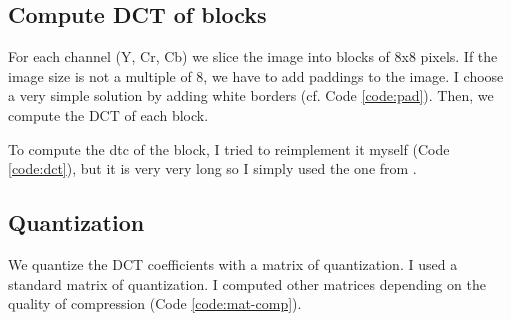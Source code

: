 \subsection{Compute DCT of blocks}

For each channel (Y, Cr, Cb) we slice the image into blocks of 8x8 pixels.
If the image size is not a multiple of 8, we have to add paddings to the image.
I choose a very simple solution by adding white borders (cf. Code \ref{code:pad}).
Then, we compute the DCT of each block.


To compute the dtc of the block, I tried to
reimplement it myself (Code \ref{code:dct}), but it is very very long
so I simply used the one from .



\subsection{Quantization}

We quantize the DCT coefficients with a matrix of quantization.
I used a standard matrix of quantization.
I computed other matrices depending on the quality of compression (Code \ref{code:mat-comp}).


